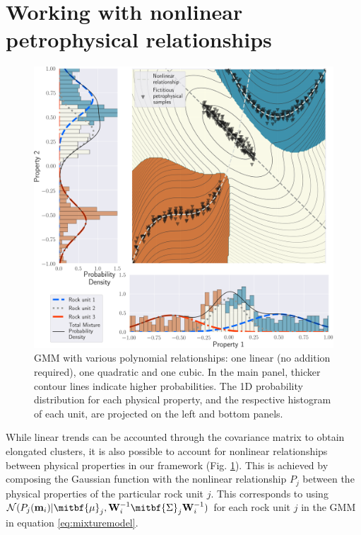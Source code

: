 \documentclass[extra, mreferee]{gji_joint} %
\begin{document}



\appendix

\section{Working with nonlinear petrophysical relationships} \label{LinearWithMappingSection}

\begin{figure}
    \includegraphics[width=\columnwidth]{Fig/LowRes/example_projection.png}
    \caption{GMM with various polynomial relationships: one linear (no addition required), one quadratic and one cubic. In the main panel, thicker contour lines indicate higher probabilities. The 1D probability distribution for each physical property, and the respective histogram of each unit, are projected on the left and bottom panels.}
    \label{fig:example_projection.png}
\end{figure}

While linear trends can be accounted through the covariance matrix to obtain elongated clusters, it is also possible to account for nonlinear relationships between physical properties in our framework (Fig. \ref{fig:example_projection.png}). This is achieved by composing the Gaussian function with the nonlinear relationship $P_j$ between the physical properties of the particular rock unit $j$. This corresponds to using $\mathcal{N}(P_j(\mathbf{m}_i)|\mitbf{\mu}_j, \mathbf{W}_i^{-1}\mitbf{\Sigma}_j\mathbf{W}_i^{-1})$ for each rock unit $j$ in the GMM in equation \eqref{eq:mixturemodel}.
\end{document}
